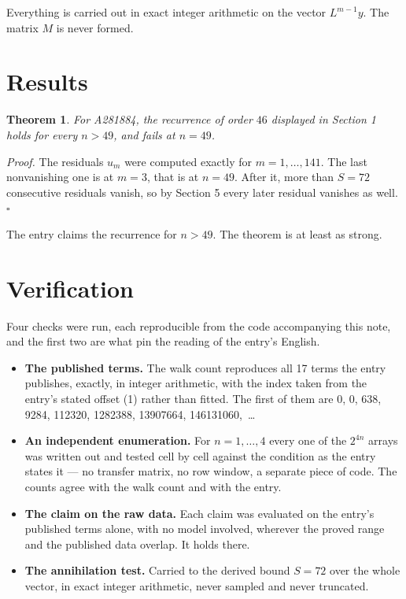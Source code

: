 \documentclass[11pt]{article}
\newtheorem{theorem}{Theorem}
\theoremstyle{definition}
\begin{document}
Everything is carried out in exact integer arithmetic on the vector $L^{m-1}y$. The matrix $M$ is never formed.

\section{Results}

\begin{theorem} For A281884, the recurrence of order $46$ displayed in Section 1 holds for every $n > 49$, and fails at $n = 49$.\end{theorem}

{\itshape Proof.} The residuals $u_m$ were computed exactly for $m = 1,\dots,141$. The last nonvanishing one is at $m = 3$, that is at $n = 49$. After it, more than $S = 72$ consecutive residuals vanish, so by Section 5 every later residual vanishes as well. $\square$

The entry claims the recurrence for $n > 49$. The theorem is at least as strong.

\section{Verification}

Four checks were run, each reproducible from the code accompanying this note, and the first two are what pin the reading of the entry's English.

\begin{itemize}

\item {\bfseries The published terms.} The walk count reproduces all 17 terms the entry publishes, exactly, in integer arithmetic, with the index taken from the entry's stated offset (1) rather than fitted. The first of them are 0, 0, 638, 9284, 112320, 1282388, 13907664, 146131060,~\dots

\item {\bfseries An independent enumeration.} For $n = 1,\dots,4$ every one of the $2^{4n}$ arrays was written out and tested cell by cell against the condition as the entry states it --- no transfer matrix, no row window, a separate piece of code. The counts agree with the walk count and with the entry.

\item {\bfseries The claim on the raw data.} Each claim was evaluated on the entry's published terms alone, with no model involved, wherever the proved range and the published data overlap. It holds there.

\item {\bfseries The annihilation test.} Carried to the derived bound $S = 72$ over the whole vector, in exact integer arithmetic, never sampled and never truncated.

\end{itemize}
\end{document}
